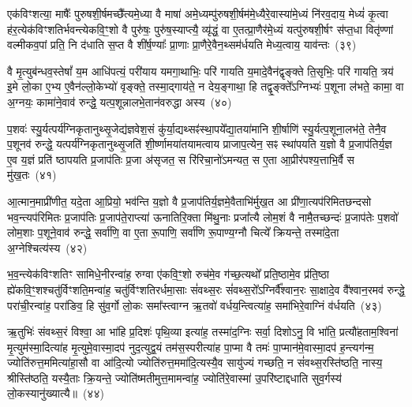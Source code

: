 {\anuvakamend[{आ॒ह॒ दे॒वानां॒ वै पत्नीः᳚ पृणै॒षा षट्च॑}]}%

एक॑विꣳशत्या॒ माषैः᳚ पुरुषशी॒र्\mbox{}षमच्छै᳚त्यमे॒ध्या वै माषा॑ अमे॒ध्यम्पु॑रुषशी॒र्\mbox{}षम॑मे॒ध्यैरे॒वास्या॑मे॒ध्यं नि॑रव॒दाय॒ मेध्यं॑ कृ॒त्वा ह॑र॒त्येक॑विꣳशतिर्भवन्त्येकवि॒ꣳ॒शो वै पुरु॑षः॒ पुरु॑ष॒स्याप्त्यै॒ व्यृ॑द्धं॒ वा ए॒तत्प्रा॒णैर॑मे॒ध्यं यत्पु॑रुषशी॒र्\mbox{}षꣳ स॑प्त॒धा वितृ॑ण्णां वल्मीकव॒पां प्रति॒ नि द॑धाति स॒प्त वै शी॑र्\mbox{}ष॒ण्याः᳚ प्रा॒णाः प्रा॒णैरे॒वैन॒थ्सम॑र्धयति मेध्य॒त्वाय॒ याव॑न्तः~(३९)

वै मृ॒त्युब॑न्धव॒स्तेषां᳚ य॒म आधि॑पत्यं॒ परी॑याय यमगा॒थाभिः॒ परि॑ गायति य॒मादे॒वैन॑द्वृङ्क्ते ति॒सृभिः॒ परि॑ गायति॒ त्रय॑ इ॒मे लो॒का ए॒भ्य ए॒वैन॑ल्लो॒केभ्यो॑ वृङ्क्ते॒ तस्मा॒द्गाय॑ते॒ न देय॒ङ्गाथा॒ हि तद्वृ॒ङ्क्ते᳚\-ऽग्निभ्यः॑ प॒शूना ल॑भते॒ कामा॒ वा अ॒ग्नयः॒ कामा॑ने॒वाव॑ रुन्द्धे॒ यत्प॒शून्नालभे॒तान॑वरुद्धा अस्य~(४०)

प॒शवः॑ स्यु॒र्यत्पर्य॑ग्निकृतानुथ्सृ॒जेद्य॑ज्ञवेश॒सं कु॑र्या॒द्यथ्सꣴ॑स्था॒पये᳚द्या॒तया॑मानि शी॒र्\mbox{}षाणि॑ स्यु॒र्यत्प॒शूना॒लभ॑ते॒ तेनै॒व प॒शूनव॑ रुन्द्धे॒ यत्पर्य॑ग्निकृतानुथ्सृ॒जति॑ शी॒र्ष्णामया॑तयामत्वाय प्राजाप॒त्येन॒ सꣴ स्था॑पयति य॒ज्ञो वै प्र॒जाप॑तिर्य॒ज्ञ ए॒व य॒ज्ञं प्रति॑ ष्ठापयति प्र॒जाप॑तिः प्र॒जा अ॑सृजत॒ स रि॑रिचा॒नो॑\-ऽमन्यत॒ स ए॒ता आ॒प्रीर॑पश्य॒त्ताभि॒र्वै स मु॑ख॒तः~(४१)

आ॒त्मान॒माप्री॑णीत॒ यदे॒ता आ॒प्रियो॒ भव॑न्ति य॒ज्ञो वै प्र॒जाप॑तिर्य॒ज्ञमे॒वैताभि॑र्मुख॒त आ प्री॑णा॒त्यप॑रिमितछन्दसो भव॒न्त्यप॑रिमितः प्र॒जाप॑तिः प्र॒जाप॑ते॒राप्त्या॑ ऊनातिरि॒क्ता मि॑थु॒नाः प्रजा᳚त्यै लोम॒शं वै नामै॒तच्छन्दः॑ प्र॒जाप॑तेः प॒शवो॑ लोम॒शाः प॒शूने॒वाव॑ रुन्द्धे॒ सर्वा॑णि॒ वा ए॒ता रू॒पाणि॒ सर्वा॑णि रू॒पाण्य॒ग्नौ चित्ये᳚ क्रियन्ते॒ तस्मा॑दे॒ता अ॒ग्नेश्चित्य॑स्य~(४२)

भ॒व॒न्त्येक॑विꣳशतिꣳ सामिधे॒नीरन्वा॑ह॒ रुग्वा ए॑कवि॒ꣳ॒शो रुच॑मे॒व ग॑च्छ॒त्यथो᳚ प्रति॒ष्ठामे॒व प्र॑ति॒ष्ठा ह्ये॑कवि॒ꣳ॒शश्चतु॑र्विꣳशति॒मन्वा॑ह॒ चतु॑र्विꣳशतिरर्धमा॒साः सं॑वथ्स॒रः सं॑वथ्स॒रो᳚\-ऽग्निर्वै᳚श्वान॒रः सा॒क्षादे॒व वै᳚श्वान॒रमव॑ रुन्द्धे॒ परा॑ची॒रन्वा॑ह॒ परा॑ङिव॒ हि सु॑व॒र्गो लो॒कः समा᳚स्त्वाग्न ऋ॒तवो॑ वर्धय॒न्त्वित्या॑ह॒ समा॑भिरे॒वाग्निं व॑र्धयति~(४३)

ऋ॒तुभिः॑ संवथ्स॒रं विश्वा॒ आ भा॑हि प्र॒दिशः॑ पृथि॒व्या इत्या॑ह॒ तस्मा॑द॒ग्निः सर्वा॒ दिशो\-ऽनु॒ वि भा॑ति॒ प्रत्यौ॑हताम॒श्विना॑ मृ॒त्युम॑स्मा॒दित्या॑ह मृ॒त्युमे॒वास्मा॒दप॑ नुद॒त्युद्व॒यं तम॑स॒स्परीत्या॑ह पा॒प्मा वै तमः॑ पा॒प्मान॑मे॒वास्मा॒दप॑ ह॒न्त्यग॑न्म॒ ज्योति॑रुत्त॒ममित्या॑हा॒सौ वा आ॑दि॒त्यो ज्योति॑रुत्त॒ममा॑दि॒त्यस्यै॒व सायु॑ज्यं गच्छति॒ न सं॑वथ्स॒रस्ति॑ष्ठति॒ नास्य॒ श्रीस्ति॑ष्ठति॒ यस्यै॒ताः क्रि॒यन्ते॒ ज्योति॑ष्मतीमुत्त॒मामन्वा॑ह॒ ज्योति॑रे॒वास्मा॑ उ॒परि॑ष्टाद्दधाति सुव॒र्गस्य॑ लो॒कस्यानु॑ख्यात्यै॥~(४४)

